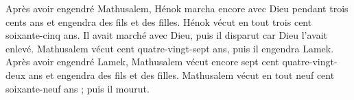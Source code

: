 Après avoir engendré Mathusalem,
	Hénok marcha encore avec Dieu pendant trois cents ans
	et engendra des fils et des filles.
Hénok vécut en tout trois cent soixante-cinq ans.
Il avait marché avec Dieu, puis il disparut car Dieu l’avait enlevé.
Mathusalem vécut cent quatre-vingt-sept ans, puis il engendra Lamek.
Après avoir engendré Lamek,
	Mathusalem vécut encore sept cent quatre-vingt-deux ans
	et engendra des fils et des filles.
Mathusalem vécut en tout neuf cent soixante-neuf ans ; puis il mourut.
